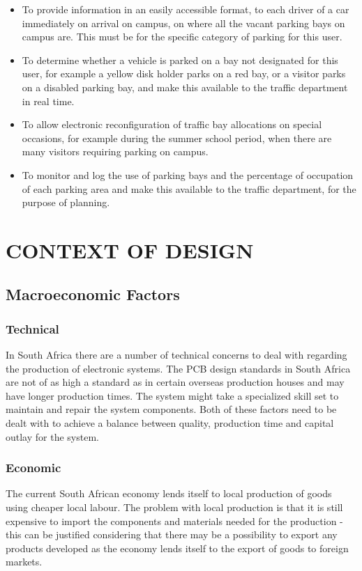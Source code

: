 \begin{itemize}
\item To provide information in an easily accessible format, to each driver of a car immediately on arrival on campus, on where all the vacant parking bays on campus are. This must be for the specific category of parking for this user.

\item To determine whether a vehicle is parked on a bay not designated for this user, for example a yellow disk holder parks on a red bay, or a visitor parks on a disabled parking bay, and make this available to the traffic department in real time.

\item To  allow electronic reconfiguration  of  traffic  bay allocations  on  special  occasions, for example during the summer school period, when there are many visitors requiring parking on campus.

\item To monitor and log the use of parking bays and the percentage of occupation of each parking area and make this available to the traffic department, for the purpose of planning.\cite{assignment}
\end{itemize}

\newpage
\section{CONTEXT OF DESIGN}
\subsection{Macroeconomic Factors}
\subsubsection{Technical} 
In South Africa there are a number of technical concerns to deal with regarding the production of electronic systems. The PCB design standards in South Africa are not of as high a standard as in certain overseas production houses and may have longer production times. The system might take a specialized skill set to maintain and repair the system components. Both of these factors need to be dealt with to achieve a balance between quality, production time and capital outlay for the system.

\subsubsection{Economic}
The current South African economy lends itself to local production of goods using cheaper local labour. The problem with local production is that it is still expensive to import the components and materials needed for the production - this can be justified considering that there may be a possibility to export any products developed as the economy lends itself to the export of goods to foreign markets. 

